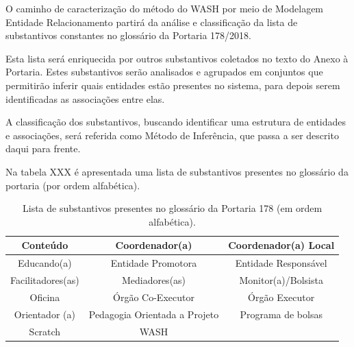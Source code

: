 \documentclass[
12pt,		%
openright,	%
twoside,  %
a4paper,			%
chapter=TITLE,		%
english,			%
french,				%
spanish,			%
brazil				%
]{USPSC-classe/USPSC}
\begin{document}
O caminho de caracteriza\c{c}\~ao do m\'etodo do WASH por meio de Modelagem Entidade Relacionamento partir\'a da an\'alise e classifica\c{c}\~ao da lista de substantivos constantes no gloss\'ario da Portaria 178/2018.









Esta lista ser\'a enriquecida por outros substantivos coletados no texto do Anexo \`a Portaria. Estes substantivos ser\~ao analisados e agrupados em conjuntos que permitir\~ao inferir quais entidades est\~ao presentes no sistema, para depois serem identificadas as associa\c{c}\~oes entre elas.









A classifica\c{c}\~ao dos substantivos, buscando identificar uma estrutura de entidades e associa\c{c}\~oes, ser\'a referida como \textquotedbl M\'etodo de Infer\^encia\textquotedbl , que passa a ser descrito daqui para frente.









Na tabela XXX \'e apresentada uma lista de substantivos presentes no gloss\'ario da portaria (por ordem alfab\'etica).













\begin{table}[htb]
\tiny
\caption{\label{443c6ee28b2545c8669e0d3532f6995e639d3416}Lista de substantivos presentes no gloss\'ario da Portaria 178 (em ordem alfab\'etica).}

\centering
\begin{tabular}{|c|c|c|}
\hline
Conte\'udo  &  Coordenador(a)  &  Coordenador(a) Local \\
\hline
Educando(a)  &  Entidade Promotora  &  Entidade Respons\'avel \\
\hline
Facilitadores(as)  &  Mediadores(as)  &  Monitor(a)/Bolsista \\
\hline
Oficina  &  \'Org\~ao Co-Executor  &  \'Org\~ao Executor \\
\hline
Orientador (a)  &  Pedagogia Orientada a Projeto  & Programa de bolsas \\
\hline
Scratch  &  WASH  &  \\
\hline
\end{tabular}
\end{table}
\end{document}
